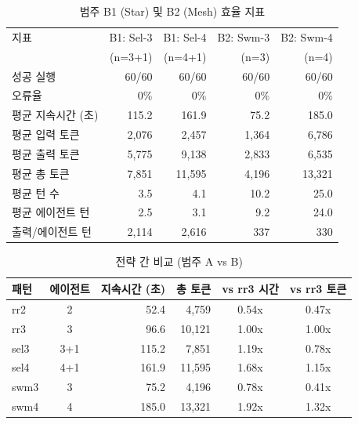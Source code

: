 \documentclass[a4paper,11pt]{article}
\begin{document}
\begin{table}[H]
\centering
\caption{범주 B1 (Star) 및 B2 (Mesh) 효율 지표}
\label{tab:cat-b}
{\small
\begin{tabular}{lrrrr}
\toprule
지표 & B1: Sel-3 & B1: Sel-4 & B2: Swm-3 & B2: Swm-4 \\
    & (n=3+1)   & (n=4+1)   & (n=3)     & (n=4)     \\
\midrule
성공 실행       & 60/60 & 60/60 & 60/60 & 60/60 \\
오류율           & 0\% & 0\% & 0\% & 0\% \\
평균 지속시간 (초) & 115.2 & 161.9 & 75.2 & 185.0 \\
평균 입력 토큰   & 2,076 & 2,457 & 1,364 & 6,786 \\
평균 출력 토큰   & 5,775 & 9,138 & 2,833 & 6,535 \\
평균 총 토큰     & 7,851 & 11,595 & 4,196 & 13,321 \\
평균 턴 수       & 3.5 & 4.1 & 10.2 & 25.0 \\
평균 에이전트 턴 & 2.5 & 3.1 & 9.2 & 24.0 \\
출력/에이전트 턴 & 2,114 & 2,616 & 337 & 330 \\
\bottomrule
\end{tabular}
}
\end{table}

\begin{table}[H]
\centering
\caption{전략 간 비교 (범주 A vs B)}
\label{tab:cross-ab}
{\small
\begin{tabular}{lcrrcc}
\toprule
패턴 & 에이전트 & 지속시간 (초) & 총 토큰 & vs rr3 시간 & vs rr3 토큰 \\
\midrule
rr2  & 2   & 52.4  & 4,759  & 0.54x & 0.47x \\
rr3  & 3   & 96.6  & 10,121 & 1.00x & 1.00x \\
sel3 & 3+1 & 115.2 & 7,851  & 1.19x & 0.78x \\
sel4 & 4+1 & 161.9 & 11,595 & 1.68x & 1.15x \\
swm3 & 3   & 75.2  & 4,196  & 0.78x & 0.41x \\
swm4 & 4   & 185.0 & 13,321 & 1.92x & 1.32x \\
\bottomrule
\end{tabular}
}
\end{table}
\end{document}
